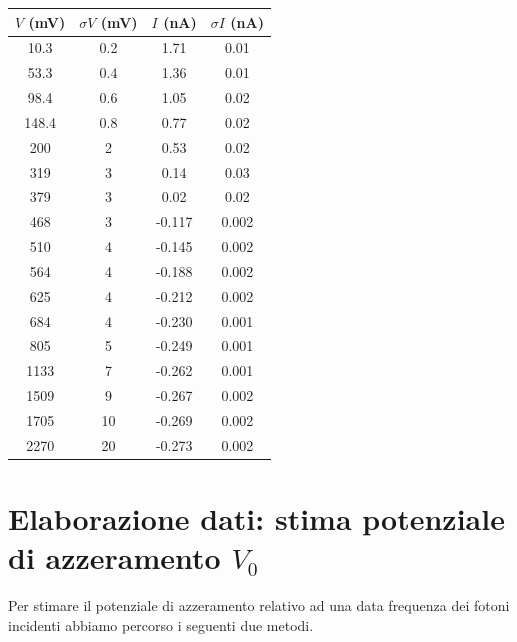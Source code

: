 \documentclass[10pt,a4paper]{article}
\begin{document}
\begin{table}[!ht]
\begin{tabular}{|c|c|c|c|}
\hline
\end{tabular}
\begin{tabular}{|c|c|c|c|}
\hline
$V$ (mV) & $\sigma V$ (mV) & $I$ (nA) & $\sigma I$ (nA)\\
\hline
10.3 & 0.2 & 1.71 & 0.01\\
53.3 & 0.4 & 1.36 & 0.01\\
98.4 & 0.6 & 1.05 & 0.02\\
148.4 & 0.8 & 0.77 & 0.02\\
200 & 2 & 0.53 & 0.02\\
319 & 3 & 0.14 & 0.03\\
379 & 3 & 0.02 & 0.02\\
468 & 3 & -0.117 & 0.002\\
510 & 4 & -0.145 & 0.002\\
564 & 4 & -0.188 & 0.002\\
625 & 4 & -0.212 & 0.002\\
684 & 4 & -0.230 & 0.001\\
805 & 5 & -0.249 & 0.001\\
1133 & 7 & -0.262 & 0.001\\
1509 & 9 & -0.267 & 0.002\\
1705 & 10 & -0.269 & 0.002\\
2270 & 20 & -0.273 & 0.002\\
\hline
\end{tabular}
\end{table}

\section{Elaborazione dati: stima potenziale di azzeramento $V_0$}
Per stimare il potenziale di azzeramento relativo ad una data frequenza dei fotoni incidenti abbiamo percorso i seguenti due metodi.
\end{document}
